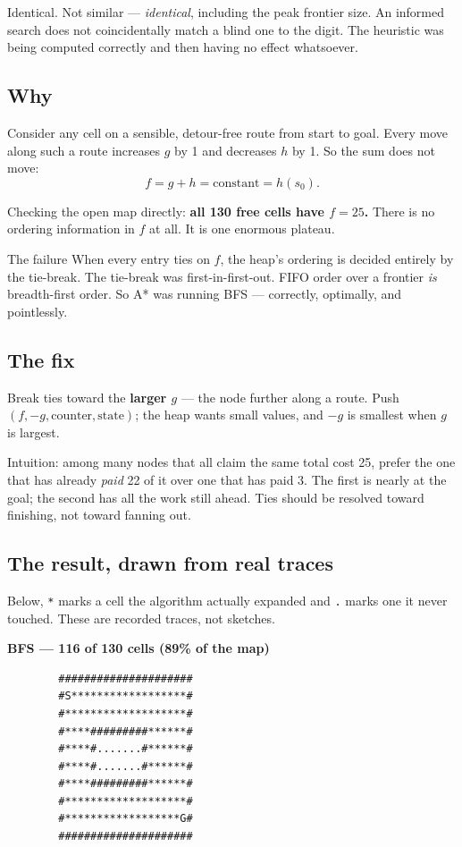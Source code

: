\documentclass[11pt,a4paper]{article}
\begin{document}
Identical. Not similar --- \emph{identical}, including the peak frontier size.
An informed search does not coincidentally match a blind one to the digit. The
heuristic was being computed correctly and then having no effect whatsoever.

\subsection{Why}

Consider any cell on a sensible, detour-free route from start to goal. Every move
along such a route increases $g$ by 1 and decreases $h$ by 1. So the sum does not
move:
\[
  f = g + h = \text{constant} = h(s_0).
\]

Checking the open map directly: \textbf{all 130 free cells have $f = 25$.} There
is no ordering information in $f$ at all. It is one enormous plateau.

\begin{warnbox}{The failure}
When every entry ties on $f$, the heap's ordering is decided entirely by the
tie-break. The tie-break was first-in-first-out. FIFO order over a frontier
\emph{is} breadth-first order. So A* was running BFS --- correctly, optimally,
and pointlessly.
\end{warnbox}

\subsection{The fix}

Break ties toward the \textbf{larger $g$} --- the node further along a route. Push
$(f, -g, \text{counter}, \text{state})$; the heap wants small values, and $-g$ is
smallest when $g$ is largest.

Intuition: among many nodes that all claim the same total cost 25, prefer the one
that has already \emph{paid} 22 of it over one that has paid 3. The first is
nearly at the goal; the second has all the work still ahead. Ties should be
resolved toward finishing, not toward fanning out.

\subsection{The result, drawn from real traces}

Below, \texttt{*} marks a cell the algorithm actually expanded and \texttt{.}
marks one it never touched. These are recorded traces, not sketches.

\vspace{4pt}
\noindent\textbf{BFS --- 116 of 130 cells (89\% of the map)}
\begin{verbatim}
        #####################
        #S******************#
        #*******************#
        #****#########******#
        #****#.......#******#
        #****#.......#******#
        #****#########******#
        #*******************#
        #******************G#
        #####################
\end{verbatim}
\end{document}
